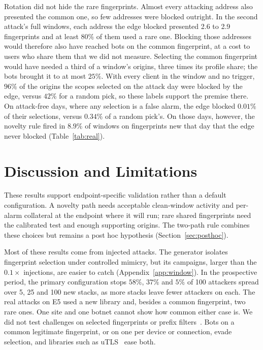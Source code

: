\documentclass[conference,letterpaper,10pt]{IEEEtran}
\newcommand\1{\textit{(i)}}
\newcommand\2{\textit{(ii)}}
\newcommand\3{\textit{(iii)}}
\newcommand\4{\textit{(iv)}}
\newcommand\5{\textit{(v)}}
\newcommand\6{\textit{(vi)}}
\newcommand\7{\textit{(vii)}}
\newcommand\8{\textit{(viii)}}
\newcommand\9{\textit{(ix)}}
\begin{document}
Rotation did not hide the rare fingerprints. Almost every attacking address also presented the common one, so few addresses were blocked outright. In the second attack's full windows, each address the edge blocked presented 2.6 to 2.9 fingerprints and at least $80\%$ of them used a rare one. Blocking those addresses would therefore also have reached bots on the common fingerprint, at a cost to users who share them that we did not measure. Selecting the common fingerprint would have needed a third of a window's origins, three times its profile share; the bots brought it to at most $25\%$. With every client in the window and no trigger, $96\%$ of the origins the scopes selected on the attack day were blocked by the edge, versus $42\%$ for a random pick, so these labels support the premise there. On attack-free days, where any selection is a false alarm, the edge blocked $0.01\%$ of their selections, versus $0.34\%$ of a random pick's. On those days, however, the novelty rule fired in $8.9\%$ of windows on fingerprints new that day that the edge never blocked (Table~\ref{tab:real}).


\section{Discussion and Limitations}
\label{sec:discussion}



These results support endpoint-specific validation rather than a default configuration. A novelty path needs acceptable clean-window activity and per-alarm collateral at the endpoint where it will run; rare shared fingerprints need the calibrated test and enough supporting origins. The two-path rule combines these choices but remains a post hoc hypothesis (Section~\ref{sec:posthoc}).    

Most of these results come from injected attacks. The generator isolates fingerprint selection under controlled mimicry, but its campaigns, larger than the $0.1\times$ injections, are easier to catch (Appendix~\ref{app:window}). In the prospective period, the primary configuration stops $58\%$, $37\%$ and $5\%$ of 100 attackers spread over 5, 25 and 100 new stacks, as more stacks leave fewer attackers on each. The real attacks on E5 used a new library and, besides a common fingerprint, two rare ones. One site and one botnet cannot show how common either case is. We did not test challenges on selected fingerprints or prefix filters~\cite{soldo2012filtering}. Bots on a common legitimate fingerprint, or on one per device or connection, evade selection, and libraries such as uTLS~\cite{frolov2019tls} ease both. 
\end{document}

